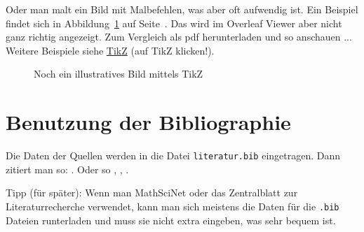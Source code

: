 \documentclass[a4paper,11pt]{article}
\theoremstyle{definition}
\theoremstyle{plain}
\begin{document}
Oder man malt ein Bild mit Malbefehlen, was aber oft aufwendig
ist. Ein Beispiel findet sich in Abbildung~\ref{fig::zwei} auf
Seite~\pageref{fig::zwei}.  Das wird im Overleaf Viewer aber nicht
ganz richtig angezeigt. Zum Vergleich als pdf herunterladen und so
anschauen ... Weitere Beispiele siehe
\href{http://www.texample.net/tikz/examples/all/}{TikZ} (auf TikZ
klicken!).


\begin{figure}[ht] \label{fig::zwei}
\begin{center}
\end{center}
\caption{Noch ein illustratives Bild mittels TikZ}
\end{figure}


\section{Benutzung der Bibliographie}

Die Daten der Quellen werden in die Datei {\tt literatur.bib}
eingetragen. Dann zitiert man so: \cite{Jech}. Oder so
\cite[S. 320]{Bosch}, \cite{Hess}, \cite{dtv}.

Tipp (für später): Wenn man MathSciNet oder das Zentralblatt zur
Literaturrecherche verwendet, kann man sich meistens die Daten für die
{\tt .bib} Dateien runterladen und muss sie nicht extra eingeben, was
sehr bequem ist.

\printbibliography
\end{document}
